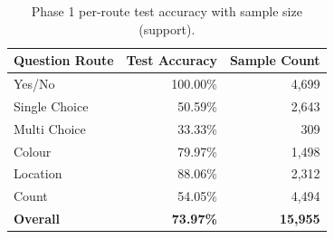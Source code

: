 \begin{table}[H]
\centering
\caption{Phase 1 per-route test accuracy with sample size (support).}
\label{tab:p1_route_support}
\begin{tabular}{lrr}
\toprule
\textbf{Question Route} & \textbf{Test Accuracy} & \textbf{Sample Count} \\
\midrule
Yes/No & 100.00\% & 4,699 \\
Single Choice & 50.59\% & 2,643 \\
Multi Choice & 33.33\% & 309 \\
Colour & 79.97\% & 1,498 \\
Location & 88.06\% & 2,312 \\
Count & 54.05\% & 4,494 \\
\midrule
\textbf{Overall} & \textbf{73.97\%} & \textbf{15,955} \\
\bottomrule
\end{tabular}
\end{table}
